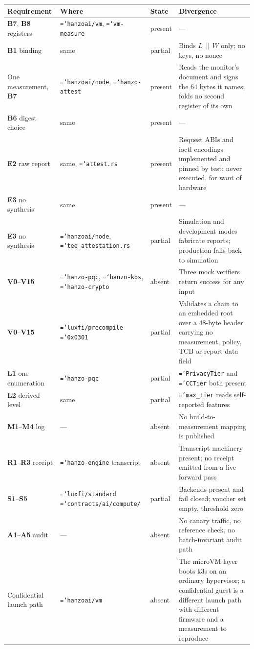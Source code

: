 \documentclass[11pt,a4paper]{article}
\newcommand{\code}[1]{\texttt{\hyphenchar\font=`\-\relax #1}}
\newcommand{\req}[1]{\textbf{#1}}
\begin{document}
\begin{center}
\small
\begin{tabular}{@{}L{0.27\textwidth}L{0.25\textwidth}lL{0.27\textwidth}@{}}
\toprule
Requirement & Where & State & Divergence \\
\midrule
\req{B7}, \req{B8} registers & \code{hanzoai/vm}, \code{vm-measure} & present & --- \\
\req{B1} binding & same & partial & Binds $L \,\|\, W$ only; no keys, no nonce \\
One measurement, \req{B7} & \code{hanzoai/node}, \code{hanzo-attest} & present &
Reads the monitor's document and signs the 64 bytes it names; folds no second
register of its own \\
\req{B6} digest choice & same & present & --- \\
\req{E2} raw report & same, \code{attest.rs} & present & Request ABIs and ioctl
encodings implemented and pinned by test; never executed, for want of hardware \\
\req{E3} no synthesis & same & present & --- \\
\req{E3} no synthesis & \code{hanzoai/node}, \code{tee\_attestation.rs} &
partial & Simulation and development modes fabricate reports; production falls back
to simulation \\
\req{V0}--\req{V15} & \code{hanzo-pqc}, \code{hanzo-kbs}, \code{hanzo-crypto} &
absent & Three mock verifiers return success for any input \\
\req{V0}--\req{V15} & \code{luxfi/precompile} \code{0x0301} & partial & Validates a
chain to an embedded root over a 48-byte header carrying no measurement, policy, TCB
or report-data field \\
\req{L1} one enumeration & \code{hanzo-pqc} & partial & \code{PrivacyTier} and
\code{CCTier} both present \\
\req{L2} derived level & same & partial & \code{max\_tier} reads self-reported
features \\
\req{M1}--\req{M4} log & --- & absent & No build-to-measurement mapping is published \\
\req{R1}--\req{R3} receipt & \code{hanzo-engine} transcript & absent & Transcript
machinery present; no receipt emitted from a live forward pass \\
\req{S1}--\req{S5} & \code{luxfi/standard} \code{contracts/ai/compute/} & partial &
Backends present and fail closed; voucher set empty, threshold zero \\
\req{A1}--\req{A5} audit & --- & absent & No canary traffic, no reference check, no
batch-invariant audit path \\
Confidential launch path & \code{hanzoai/vm} & absent & The microVM layer boots k3s
on an ordinary hypervisor; a confidential guest is a different launch path with
different firmware and a measurement to reproduce \\
\bottomrule
\end{tabular}
\end{center}
\end{document}
